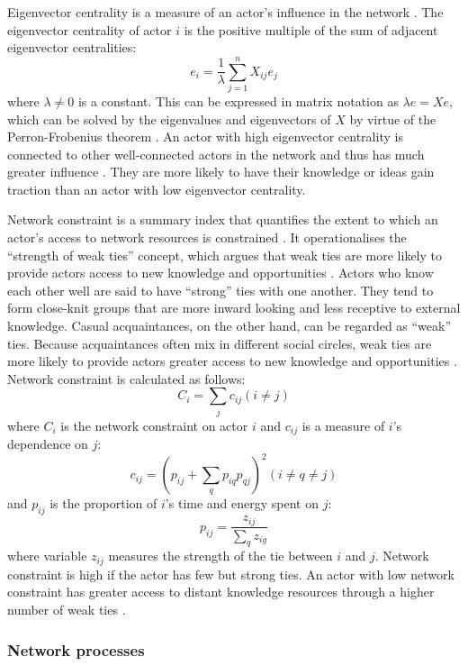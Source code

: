 Eigenvector centrality is a measure of an actor's influence in the network \citep{bonacich1987power}. The eigenvector centrality of actor $i$ is the positive multiple of the sum of adjacent eigenvector centralities: $$e_i = \frac{1}{\lambda} \sum_{j=1}^n X_{ij}e_j$$ where $\lambda \neq 0$ is a constant. This can be expressed in matrix notation as $\lambda e = Xe$, which can be solved by the eigenvalues and eigenvectors of $X$ by virtue of the Perron\hyp{}Frobenius theorem \citep{ruhnau2000eigenvector}. An actor with high eigenvector centrality is connected to other well-connected actors in the network and thus has much greater influence \citep{borgatti2013analyzing}. They are more likely to have their knowledge or ideas gain traction than an actor with low eigenvector centrality. \medskip

Network constraint is a summary index that quantifies the extent to which an actor's access to network resources is constrained \citep{burt1992structural}. It operationalises the \enquote{strength of weak ties} concept, which argues that weak ties are more likely to provide actors access to new knowledge and opportunities \citep{granovetter1973strength}. Actors who know each other well are said to have \enquote{strong} ties with one another. They tend to form close-knit groups that are more inward looking and less receptive to external knowledge. Casual acquaintances, on the other hand, can be regarded as \enquote{weak} ties. Because acquaintances often mix in different social circles, weak ties are more likely to provide actors greater access to new knowledge and opportunities \citep{granovetter1973strength}. Network constraint is calculated as follows: $$ C_i = \sum_j c_{ij} (i \neq j) $$ where $C_i$ is the network constraint on actor $i$ and $c_{ij}$ is a measure of $i$'s dependence on $j$: $$ c_{ij} = (p_{ij} + \sum_qp_{iq}p_{qj})^2 (i \neq q \ne j) $$ and $p_{ij}$ is the proportion of $i$'s time and energy spent on $j$: $$ p_{ij} = \frac{z_{ij}}{\sum_qz_{ig}} $$ where variable $z_{ij}$ measures the strength of the tie between $i$ and $j$. Network constraint is high if the actor has few but strong ties. An actor with low network constraint has greater access to distant knowledge resources through a higher number of weak ties \citep{burt1992structural}. \medskip

\subsubsection{Network processes}

